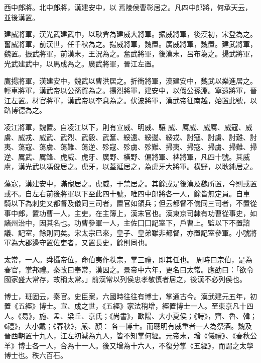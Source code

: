 \begin{pinyinscope}
 西中郎將。北中郎將，漢建安中，以焉陵侯曹彰居之。凡四中郎將，何承天云，並後漢置。



 建威將軍，漢光武建武中，以耿弇為建威大將軍。振威將軍，後漢初，宋登為之。
 奮威將軍，前漢世，任千秋為之。揚威將軍，魏置。廣威將軍，魏置。建武將軍，魏置。振武將軍，前漢末，王況為之。奮武將軍，後漢末，呂布為之。揚武將軍，光武建武中，以馬成為之。廣武將軍，晉江左置。



 鷹揚將軍，漢建安中，魏武以曹洪居之。折衝將軍，漢建安中，魏武以樂進居之。輕車將軍，漢武帝以公孫賀為之。揚烈將軍，建安中，以假公孫淵。寧遠將軍，晉江左置。材官將軍，漢武帝以李息為之。伏波將軍，漢武帝征南越，始置此號，以路博德為之。



 凌江將軍，魏置。自凌江以下，則有宣威、明威、驤
 威、厲威、威厲、威寇、威虜、威戎、威武、武烈、武毅、武奮、綏遠、綏邊、綏戎、討寇、討虜、討難、討夷、蕩寇、蕩虜、蕩難、蕩逆、殄寇、殄虜、殄難、掃夷、掃寇、掃虜、掃難、掃逆、厲武、厲鋒、虎威、虎牙、廣野、橫野、偏將軍、裨將軍，凡四十號。其威虜，漢光武以馮俊居之。虎牙，以蓋延居之，為虎牙大將軍。橫野，以耿純居之。



 蕩寇，漢建安中，滿寵居之。虎威，于禁居之。其餘或是後漢及魏所置，今則或置或不。自左右前後將軍以下至此四十號，唯四中郎將各一人，餘皆無定員。自車
 騎以下為刺史又都督及儀同三司者，置官如領兵；但云都督不儀同三司者，不置從事中郎，置功曹一人，主吏，在主簿上，漢末官也。漢東京司隸有功曹從事史，如諸州治中，因其名也。功曹參軍一人，主佐囗囗記室下，戶曹上。監以下不置諮議、記室，餘則同矣。宋太宗已來，皇子、皇弟雖非都督，亦置記室參軍。小號將軍為大郡邊守置佐吏者，又置長史，餘則同也。



 太常，一人。舜攝帝位，命伯夷作秩宗，掌三禮，即其任也。
 周時曰宗伯，是為春官，掌邦禮。秦改曰奉常，漢因之。景帝中六年，更名曰太常。應劭曰：「欲令國家盛大常存，故稱太常。」前漢常以列侯忠孝敬慎者居之，後漢不必列侯也。



 博士，班固云，秦官。史臣案，六國時往往有博士，掌通古今。漢武建元五年，初置《五經》博士。宣、成之世，《五經》家法稍增，經置博士一人。至東京凡十四人。《易》，施、孟、梁丘、京氏；《尚書》，歐陽、大小夏侯；《詩》，齊、魯、韓；《禮》，大小戴；《春秋》，嚴、顏：
 各一博士。而聰明有威重者一人為祭酒。魏及晉西朝置十九人，江左初減為九人，皆不知掌何經。元帝末，增《儀禮》、《春秋公羊》博士各一人，合為十一人。後又增為十六人，不復分掌《五經》，而謂之太學博士也。秩六百石。




\end{pinyinscope}
